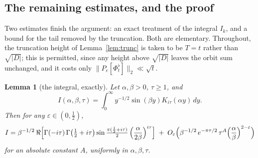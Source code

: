 \documentclass[11pt,a4paper]{article}
\newtheorem{lemma}[theorem]{Lemma}
\theoremstyle{remark}\newtheorem{remark}[theorem]{Remark}
\begin{document}
\subsection{The remaining estimates, and the proof}\label{sec:proof}

Two estimates finish the argument: an exact treatment of the integral $I_k$, and a bound for the tail removed by the
truncation. Both are elementary. Throughout, the truncation height of Lemma~\ref{lem:trunc} is taken to be $T=t$
rather than $\sqrt{|D|}$; this is permitted, since any height above $\sqrt{|D|}$ leaves the orbit sum unchanged,
and it costs only $\|P_e[\Phi^\flat_t]\|_2\ll\sqrt t$.

\begin{lemma}[the integral, exactly]\label{lem:mellin}
Let $\alpha,\beta>0$, $\tau\ge1$, and
\[
I(\alpha,\beta,\tau)=\int_0^\infty y^{-1/2}\sin(\beta y)K_{i\tau}(\alpha y)\,dy .
\]
Then for any $\varepsilon\in(0,\tfrac12)$,
\[
I=\beta^{-1/2}\,\Re\Bigl[\Gamma(-i\tau)\,\Gamma\bigl(\tfrac12+i\tau\bigr)\sin\tfrac{\pi(\frac12+i\tau)}2\,
\Bigl(\frac\alpha{2\beta}\Bigr)^{i\tau}\Bigr]\;+\;O_\varepsilon\Bigl(\beta^{-1/2}\,e^{-\pi\tau/2}\,\tau^{A}\Bigl(\frac\alpha\beta\Bigr)^{2-\varepsilon}\Bigr)
\]
for an absolute constant $A$, uniformly in $\alpha,\beta,\tau$.
\end{lemma}
\end{document}
